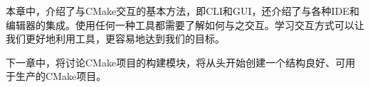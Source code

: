 本章中，介绍了与CMake交互的基本方法，即CLI和GUI，还介绍了与各种IDE和编辑器的集成。使用任何一种工具都需要了解如何与之交互。学习交互方式可以让我们更好地利用工具，更容易地达到我们的目标。

下一章中，将讨论CMake项目的构建模块，将从头开始创建一个结构良好、可用于生产的CMake项目。